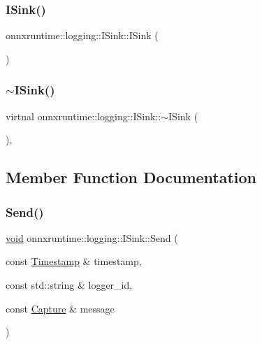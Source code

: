 \subsubsection{\texorpdfstring{I\+Sink()}{ISink()}}
{\footnotesize\ttfamily onnxruntime\+::logging\+::\+I\+Sink\+::\+I\+Sink (\begin{DoxyParamCaption}{ }\end{DoxyParamCaption})\hspace{0.3cm}{\ttfamily [default]}}

\mbox{\label{classonnxruntime_1_1logging_1_1ISink_a30082194671f1a1a612ff29d10e00d42}} 
\subsubsection{\texorpdfstring{$\sim$\+I\+Sink()}{~ISink()}}
{\footnotesize\ttfamily virtual onnxruntime\+::logging\+::\+I\+Sink\+::$\sim$\+I\+Sink (\begin{DoxyParamCaption}{ }\end{DoxyParamCaption})\hspace{0.3cm}{\ttfamily [virtual]}, {\ttfamily [default]}}



\subsection{Member Function Documentation}
\mbox{\label{classonnxruntime_1_1logging_1_1ISink_a9460947ff02092785dbb4ee7ddddcb4a}} 
\subsubsection{\texorpdfstring{Send()}{Send()}}
{\footnotesize\ttfamily \mbox{\hyperlink{mlasi_8h_a88f941d423cb2a819b70a1358982b1a6}{void}} onnxruntime\+::logging\+::\+I\+Sink\+::\+Send (\begin{DoxyParamCaption}\item[{const \mbox{\hyperlink{namespaceonnxruntime_1_1logging_ae7a2a84f622a028e2ad495a74289012d}{Timestamp}} \&}]{timestamp,  }\item[{const std\+::string \&}]{logger\+\_\+id,  }\item[{const \mbox{\hyperlink{classonnxruntime_1_1logging_1_1Capture}{Capture}} \&}]{message }\end{DoxyParamCaption})\hspace{0.3cm}{\ttfamily [inline]}}

